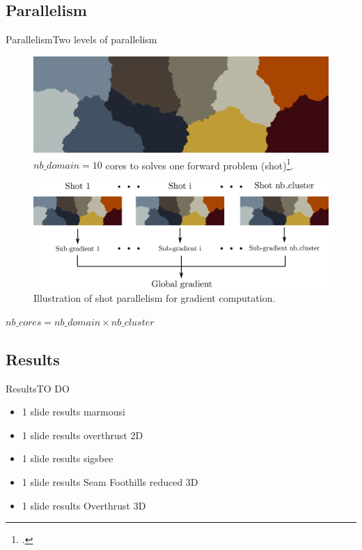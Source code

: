 \subsection{Parallelism}
\begin{frame}{Parallelism}{Two levels of parallelism}

  \begin{overprint}
  \begin{figure}[H]
    \centering
    \includegraphics[scale=0.15]{image/partition.png}
    \caption{$nb\_domain=10$ cores to solves one forward problem (shot)\footcite{karypis1997parmetis}.}
    \label{partition}
  \end{figure}
\begin{figure}[H]
  \centering
  \includegraphics[scale=0.055]{image/partition_cluster.pdf}
  \caption*{Illustration of shot parallelism for gradient computation.}
  \label{partition_cluster}
\end{figure}

$nb\_cores = nb\_domain \times nb\_cluster$

  \end{overprint}
  \end{frame}

\subsection{Results}
\begin{frame}{Results}{TO DO}

  \begin{itemize}
  \item 1 slide results marmousi
  \item 1 slide results overthrust 2D
  \item 1 slide results sigsbee
  \item 1 slide results Seam Foothills reduced 3D
  \item 1 slide results Overthrust 3D
  \end{itemize}
\end{frame}
